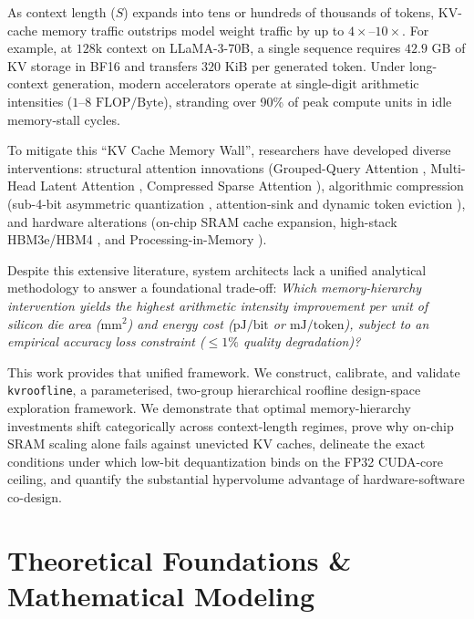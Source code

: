 \documentclass[conference,onecolumn]{IEEEtran}
\begin{document}
As context length ($S$) expands into tens or hundreds of thousands of tokens, KV-cache memory traffic outstrips model weight traffic by up to $4\times$--$10\times$. For example, at $128\text{k}$ context on LLaMA-3-70B, a single sequence requires $42.9\text{ GB}$ of KV storage in BF16 and transfers $320\text{ KiB}$ per generated token. Under long-context generation, modern accelerators operate at single-digit arithmetic intensities ($1$--$8\text{ FLOP/Byte}$), stranding over 90\% of peak compute units in idle memory-stall cycles.

To mitigate this ``KV Cache Memory Wall'', researchers have developed diverse interventions: structural attention innovations (Grouped-Query Attention \cite{ainslie2023gqa}, Multi-Head Latent Attention \cite{deepseek2024v2}, Compressed Sparse Attention \cite{deepseek2026v41flash}), algorithmic compression (sub-4-bit asymmetric quantization \cite{liu2024kivi, hooper2024kvquant}, attention-sink and dynamic token eviction \cite{xiao2023streamingllm, zhang2023h2o, tang2024quest}), and hardware alterations (on-chip SRAM cache expansion, high-stack HBM3e/HBM4 \cite{williams2009roofline}, and Processing-in-Memory \cite{duan2025hpim, liu2026pam}).

Despite this extensive literature, system architects lack a unified analytical methodology to answer a foundational trade-off: \textit{Which memory-hierarchy intervention yields the highest arithmetic intensity improvement per unit of silicon die area ($\text{mm}^2$) and energy cost ($\text{pJ/bit}$ or $\text{mJ/token}$), subject to an empirical accuracy loss constraint ($\le 1\%$ quality degradation)?}

This work provides that unified framework. We construct, calibrate, and validate \texttt{kvroofline}, a parameterised, two-group hierarchical roofline design-space exploration framework. We demonstrate that optimal memory-hierarchy investments shift categorically across context-length regimes, prove why on-chip SRAM scaling alone fails against unevicted KV caches, delineate the exact conditions under which low-bit dequantization binds on the FP32 CUDA-core ceiling, and quantify the substantial hypervolume advantage of hardware-software co-design.

\section{Theoretical Foundations \& Mathematical Modeling}
\end{document}
